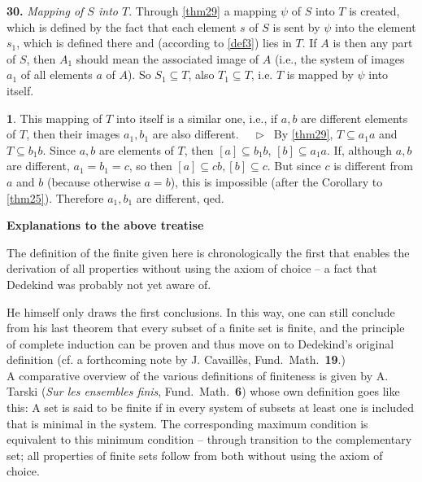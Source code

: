 \documentclass[leqno,hidelinks,10pt]{article}
\theoremstyle{definition}
\newtheorem{satz}{\protect\satzname}
\newcommand{\satzname}{}
\renewcommand{\satzname}{\hspace{-4pt}.\ Satz}%
\renewcommand{\satzname}{\hspace{-4pt}.\ Theorem}%
\newcommand\Beweis{\medskip \newline $ \phantom{'.'} \rhd \ $}%
\newcommand{\partof}{\subseteq}
\newcommand{\sref}[1]{\underline{\ref{#1}}}%
\begin{document}
\begin{paracol}{2}
\begin{rightcolumn}
\noindent \textbf{30.}\label{thm30} \hspace{-9pt} \emph{Mapping of $S$ into $T$}.
Through \sref{thm29} a mapping $\psi$ of $S$ into $T$ is
created, which is defined by the fact that each element $s$ of $S$ is sent by
$\psi$ into the element $s_1$, which is defined there and (according to \sref{def3})
lies in $T$. If $A$ is then any part of $S$, then $A_1$ should mean the associated
image of $A$ (i.e., the system of images $a_1$ of all elements $a$ of $A$). So
$S_1 \partof T$, also $T_1 \partof T$, i.e. $T$ is mapped by $\psi$ into itself.

\begin{satz}\label{thm31} 
This mapping of $T$ into itself is a similar one, i.e., if $a, b$ are different
elements of $T$, then their images $a_1, b_1$ are also different.%
\Beweis
By \sref{thm29}, $T \partof a_1a$ and $T \partof b_1b$. Since $a, b$ are elements
of $T$, then $[a] \partof b_1b$, $[b] \partof a_1a$. If, although $a, b$ are
different, $a_1 = b_1  = c$, so then $[a] \partof cb, [b] \partof c$. But since
$c$ is different from $a$ and $b$ (because otherwise $a = b$), this is impossible
(after the Corollary to \sref{thm25}). Therefore $a_1, b_1$ are different, qed.
\end{satz}

\newpage

\hspace{84pt}

\begin{center}{\Large\textbf{Explanations to the above treatise \ \\ }}
\end{center}

\vspace{30pt}

\fontsize{9}{9}\selectfont
\justifying
The definition of the finite given here is chronologically the first that enables
the derivation of all properties without using the axiom of choice -- a fact that
Dedekind was probably not yet aware of.

He himself only draws the first conclusions. In this way, one can still conclude
from his last theorem that every subset of a finite set is finite, and the principle
of complete induction can be proven and thus move on to Dedekind's original
definition (cf. a forthcoming note by J. Cavaillès, Fund.\ Math.\ \textbf{19}.)
\ \\

A comparative overview of the various definitions of finiteness is given by A.
Tarski (\emph{Sur les ensembles finis}, Fund.\ Math.\ \textbf{6}) whose own
definition goes like this: A set is said to be finite if in every system of
subsets at least one is included that is minimal in the system. The corresponding
maximum condition is equivalent to this minimum condition -- through transition to the
complementary set; all properties of finite sets follow from both without using
the axiom of choice.
\ \\


\end{rightcolumn}
\end{paracol}
\end{document}
